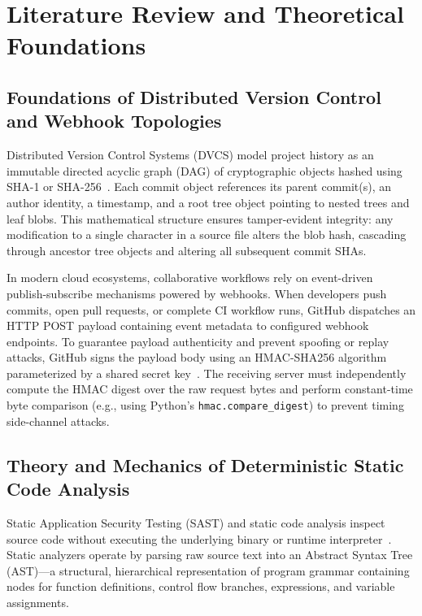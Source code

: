 \documentclass[12pt,a4paper,oneside]{report}
\begin{document}
\cleardoublepage

\chapter{Literature Review and Theoretical Foundations}
\label{chap:literature-review}

\section{Foundations of Distributed Version Control and Webhook Topologies}
\label{sec:lit-dvcs}

Distributed Version Control Systems (DVCS) model project history as an immutable directed acyclic graph (DAG) of cryptographic objects hashed using SHA-1 or SHA-256~\cite{chacon2014pro}. Each commit object references its parent commit(s), an author identity, a timestamp, and a root tree object pointing to nested trees and leaf blobs. This mathematical structure ensures tamper-evident integrity: any modification to a single character in a source file alters the blob hash, cascading through ancestor tree objects and altering all subsequent commit SHAs.

In modern cloud ecosystems, collaborative workflows rely on event-driven publish-subscribe mechanisms powered by webhooks. When developers push commits, open pull requests, or complete CI workflow runs, GitHub dispatches an HTTP POST payload containing event metadata to configured webhook endpoints. To guarantee payload authenticity and prevent spoofing or replay attacks, GitHub signs the payload body using an HMAC-SHA256 algorithm parameterized by a shared secret key~\cite{rfc2104hmac}. The receiving server must independently compute the HMAC digest over the raw request bytes and perform constant-time byte comparison (e.g., using Python's \texttt{hmac.compare\_digest}) to prevent timing side-channel attacks.

\section{Theory and Mechanics of Deterministic Static Code Analysis}
\label{sec:lit-static-analysis}

Static Application Security Testing (SAST) and static code analysis inspect source code without executing the underlying binary or runtime interpreter~\cite{chess2004static}. Static analyzers operate by parsing raw source text into an Abstract Syntax Tree (AST)---a structural, hierarchical representation of program grammar containing nodes for function definitions, control flow branches, expressions, and variable assignments.
\end{document}
